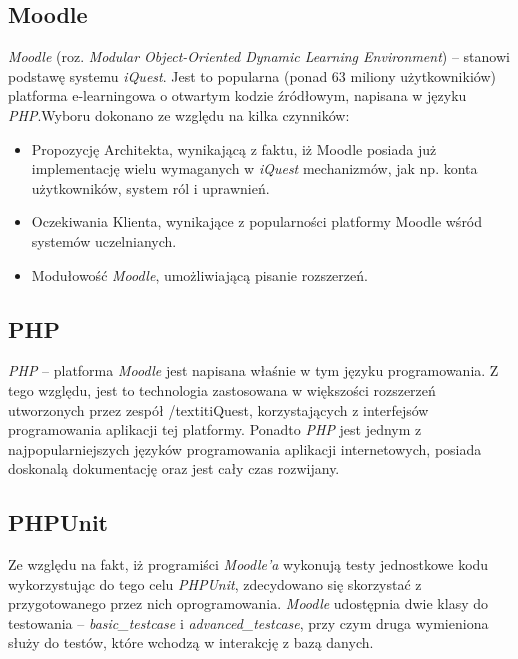 \subsection{Moodle}
\emph{Moodle} (roz. \textit{Modular Object-Oriented Dynamic Learning Environment}) -- stanowi podstawę systemu \textit{iQuest}. Jest to popularna (ponad 63 miliony użytkownikiów) platforma e-learningowa o otwartym kodzie źródłowym, napisana w języku \emph{PHP}.Wyboru dokonano ze względu na kilka czynników:
\begin{itemize}
\item{Propozycję Architekta, wynikającą z faktu, iż Moodle posiada już implementację wielu wymaganych w \textit{iQuest} mechanizmów, jak np. konta użytkowników, system ról i uprawnień.}
\item{Oczekiwania Klienta, wynikające z popularności platformy Moodle wśród systemów uczelnianych.}
\item{Modułowość \emph{Moodle}, umożliwiającą pisanie rozszerzeń.}
\end{itemize}

\subsection{PHP}
\emph{PHP} -- platforma \textit{Moodle} jest napisana właśnie w tym języku programowania. Z tego względu, jest to technologia zastosowana w większości rozszerzeń utworzonych przez zespół /textit{iQuest}, korzystających z interfejsów programowania aplikacji tej platformy. Ponadto \emph{PHP} jest jednym z najpopularniejszych języków programowania aplikacji internetowych, posiada doskonalą dokumentację oraz jest cały czas rozwijany.

\subsection{PHPUnit}
Ze względu na fakt, iż programiści \textit{Moodle'a} wykonują testy jednostkowe kodu wykorzystując do tego celu \emph{PHPUnit}, zdecydowano się skorzystać z przygotowanego przez nich oprogramowania. \textit{Moodle} udostępnia dwie klasy do testowania -- \textit{basic\_testcase} i \textit{advanced\_testcase}, przy czym druga wymieniona służy do testów, które wchodzą w interakcję z bazą danych.


